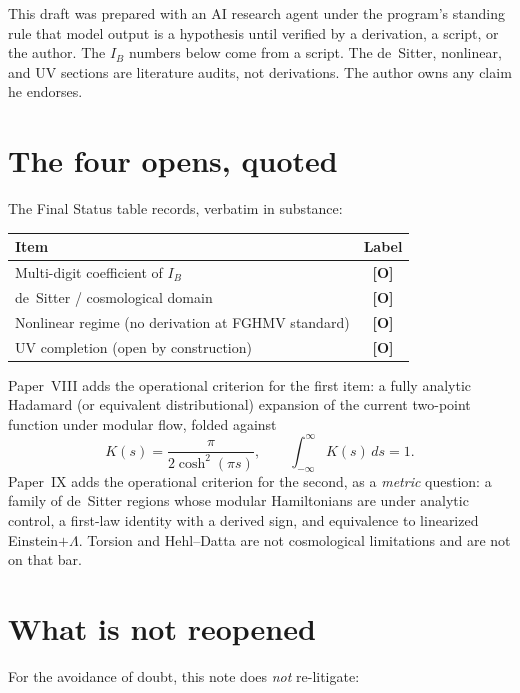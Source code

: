 \documentclass[11pt]{article}
\theoremstyle{definition}
\newcommand{\pO}{\textbf{[O]}}
\newcommand{\IB}{I_B}
\begin{document}
This draft was prepared with an AI research agent under the program's
standing rule that model output is a hypothesis until verified by a
derivation, a script, or the author. The $I_B$ numbers below come from
a script. The de~Sitter, nonlinear, and UV sections are literature
audits, not derivations. The author owns any claim he endorses.

\section{The four opens, quoted}

The Final Status table \cite{McGwierFS} records, verbatim in substance:

\begin{center}
\begin{tabular}{@{}p{}c@{}}
\toprule
Item & Label \\
\midrule
Multi-digit coefficient of $\IB$ & \pO{} \\
de~Sitter / cosmological domain & \pO{} \\
Nonlinear regime (no derivation at FGHMV standard) & \pO{} \\
UV completion (open by construction) & \pO{} \\
\bottomrule
\end{tabular}
\end{center}

Paper~VIII \cite{McGwierVIII} adds the operational criterion for the
first item: a fully analytic Hadamard (or equivalent distributional)
expansion of the current two-point function under modular flow, folded
against
\begin{equation}
K(s)=\frac{\pi}{2\cosh^2(\pi s)},
\qquad
\int_{-\infty}^{\infty}K(s)\,ds=1.
\label{eq:kernel}
\end{equation}
Paper~IX \cite{McGwierIX} adds the operational criterion for the second,
as a \emph{metric} question: a family of de~Sitter regions whose
modular Hamiltonians are under analytic control, a first-law identity
with a derived sign, and equivalence to linearized Einstein$+\Lambda$.
Torsion and Hehl--Datta are not cosmological limitations and are not
on that bar.

\section{What is not reopened}

For the avoidance of doubt, this note does \emph{not} re-litigate:
\end{document}
